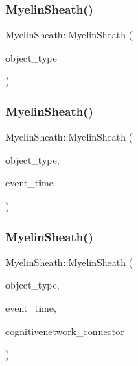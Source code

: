 \subsubsection{\texorpdfstring{Myelin\+Sheath()}{MyelinSheath()}\hspace{0.1cm}{\footnotesize\ttfamily [2/4]}}
{\footnotesize\ttfamily Myelin\+Sheath\+::\+Myelin\+Sheath (\begin{DoxyParamCaption}\item[{unsigned int}]{object\+\_\+type }\end{DoxyParamCaption})\hspace{0.3cm}{\ttfamily [inline]}}

\mbox{\label{classMyelinSheath_a34a80a57ebcde58933a07ca9d99780eb}} 
\subsubsection{\texorpdfstring{Myelin\+Sheath()}{MyelinSheath()}\hspace{0.1cm}{\footnotesize\ttfamily [3/4]}}
{\footnotesize\ttfamily Myelin\+Sheath\+::\+Myelin\+Sheath (\begin{DoxyParamCaption}\item[{unsigned int}]{object\+\_\+type,  }\item[{std\+::chrono\+::time\+\_\+point$<$ \mbox{\hyperlink{universe_8h_a0ef8d951d1ca5ab3cfaf7ab4c7a6fd80}{Clock}} $>$}]{event\+\_\+time }\end{DoxyParamCaption})\hspace{0.3cm}{\ttfamily [inline]}}

\mbox{\label{classMyelinSheath_aac107d8f22ca3c02f2d346f44950e6d0}} 
\subsubsection{\texorpdfstring{Myelin\+Sheath()}{MyelinSheath()}\hspace{0.1cm}{\footnotesize\ttfamily [4/4]}}
{\footnotesize\ttfamily Myelin\+Sheath\+::\+Myelin\+Sheath (\begin{DoxyParamCaption}\item[{unsigned int}]{object\+\_\+type,  }\item[{std\+::chrono\+::time\+\_\+point$<$ \mbox{\hyperlink{universe_8h_a0ef8d951d1ca5ab3cfaf7ab4c7a6fd80}{Clock}} $>$}]{event\+\_\+time,  }\item[{\mbox{\hyperlink{classCognitiveNetwork}{Cognitive\+Network}} \&}]{cognitivenetwork\+\_\+connector }\end{DoxyParamCaption})\hspace{0.3cm}{\ttfamily [inline]}}

